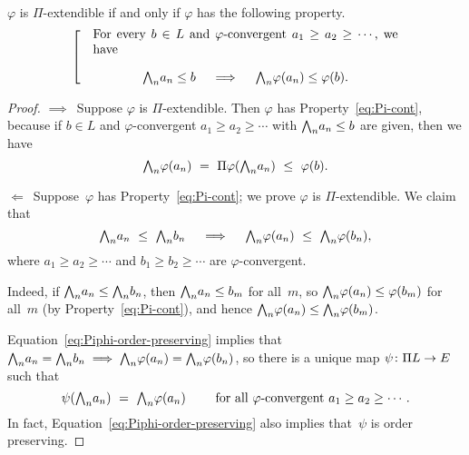 \documentclass[main.tex]{subfiles}
\begin{document}
%
%
\begin{lem}
\label{L:Pi-continuity}
$\varphi$ is $\Pi$-extendible
if and only if  $\varphi$
has the following property.
\begin{equation}
\label{eq:Pi-cont}
\left[ \quad
\begin{minipage}{.7\columnwidth}
For every $b\in L$ and $\varphi$-convergent 
 $a_1 \geq a_2 \geq \dotsb$,
we have
\begin{equation*}
\bw_n a_n \leq b
\quad\implies\quad
\bw_n \varphi (a_n) \leq \varphi(b).
\end{equation*}
\end{minipage}
\right.
\end{equation}
\end{lem}
\begin{proof}
$\implies$\ 
Suppose $\varphi$ is $\Pi$-extendible.
Then $\varphi$ has Property~\eqref{eq:Pi-cont},
because if $b\in L$ and $\varphi$-convergent $a_1 \geq a_2 \geq \dotsb$
with $\textstyle{\bigwedge}_n a_n \leq b$ are given,
then we have
\begin{equation*}
\bw_n \varphi(a_n) 
\ =\ 
\Pi\varphi(\bw_n a_n)
\ \leq\ 
\varphi(b).
\end{equation*}

\noindent$\Longleftarrow$\ 
Suppose~$\varphi$ has Property~\eqref{eq:Pi-cont};
we prove $\varphi$ is $\Pi$-extendible.
We claim that
\begin{equation}
\label{eq:Piphi-order-preserving}
\textstyle{\bigwedge}_n a_n \ \leq\ \textstyle{\bigwedge}_n b_n 
\quad\implies\quad
\textstyle{\bigwedge}_n \varphi(a_n) \ \leq\ \textstyle{\bigwedge}_n \varphi(b_n),
\end{equation}
where $a_1 \geq a_2 \geq \dotsb$ and $b_1 \geq b_2 \geq \dotsb$
are $\varphi$-convergent.

Indeed,
if $\textstyle{\bigwedge}_n a_n \leq \textstyle{\bigwedge}_n b_n$,
then $\textstyle{\bigwedge}_n a_n \leq b_m$ for all~$m$,
so $\textstyle{\bigwedge}_n \varphi(a_n) \leq \varphi(b_m)$ for all~$m$
(by Property~\eqref{eq:Pi-cont}),
and hence $\textstyle{\bigwedge}_n \varphi(a_n) \leq \textstyle{\bigwedge}_n \varphi(b_m)$.

Equation~\eqref{eq:Piphi-order-preserving} implies that
 $\textstyle{\bigwedge}_n a_n = \textstyle{\bigwedge}_n b_n \implies \textstyle{\bigwedge}_n\varphi(a_n) = \textstyle{\bigwedge}_n \varphi(b_n)$,
so there is a unique map $\psi\colon \Pi L \rightarrow E$ such that
\begin{equation*}
\psi(\textstyle{\bigwedge}_n a_n) \ =\ \textstyle{\bigwedge}_n \varphi(a_n)
\qquad
\text{ for all $\varphi$-convergent }a_1 \geq a_2 \geq \dotsb.
\end{equation*}
In fact, 
Equation~\eqref{eq:Piphi-order-preserving}
also implies that~$\psi$ is order preserving.


\end{proof}
\end{document}
